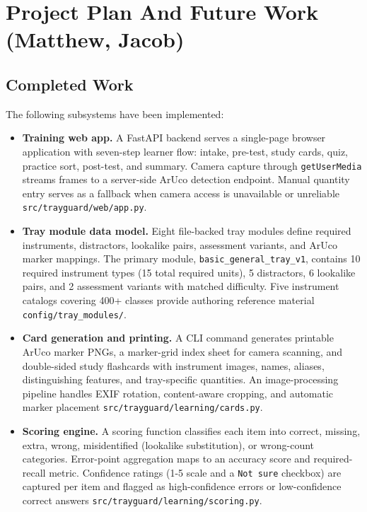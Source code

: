 \documentclass[10pt,a4paper]{article}
\begin{document}

\section{Project Plan And Future Work \hfill {\normalfont\small (Matthew, Jacob)}}
\label{sec:project-plan-and-future-work}
\subsection{Completed Work}


The following subsystems have been implemented:

\begin{itemize}
  \item \textbf{Training web app.} A FastAPI backend serves a single-page browser application with seven-step learner flow: intake, pre-test, study cards, quiz, practice sort, post-test, and summary. Camera capture through \texttt{getUserMedia} streams frames to a server-side ArUco detection endpoint. Manual quantity entry serves as a fallback when camera access is unavailable or unreliable \texttt{src/trayguard/web/app.py}.
  \item \textbf{Tray module data model.} Eight file-backed tray modules define required instruments, distractors, lookalike pairs, assessment variants, and ArUco marker mappings. The primary module, \texttt{basic\_general\_tray\_v1}, contains 10 required instrument types (15 total required units), 5 distractors, 6 lookalike pairs, and 2 assessment variants with matched difficulty. Five instrument catalogs covering 400+ classes provide authoring reference material \texttt{config/tray\_modules/}.
  \item \textbf{Card generation and printing.} A CLI command generates printable ArUco marker PNGs, a marker-grid index sheet for camera scanning, and double-sided study flashcards with instrument images, names, aliases, distinguishing features, and tray-specific quantities. An image-processing pipeline handles EXIF rotation, content-aware cropping, and automatic marker placement \texttt{src/trayguard/learning/cards.py}.
  \item \textbf{Scoring engine.} A scoring function classifies each item into correct, missing, extra, wrong, misidentified (lookalike substitution), or wrong-count categories. Error-point aggregation maps to an accuracy score and required-recall metric. Confidence ratings (1-5 scale and a \texttt{Not sure} checkbox) are captured per item and flagged as high-confidence errors or low-confidence correct answers \texttt{src/trayguard/learning/scoring.py}.

\end{itemize}
\end{document}
